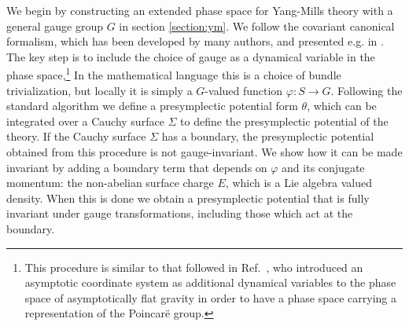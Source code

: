 \documentclass[a4paper,11pt]{article}
\begin{document}
We begin by constructing an extended phase space for Yang-Mills theory with a general gauge group $G$ in section \ref{section:ym}.
We follow the covariant canonical formalism, which has been developed by many authors, and presented e.g. in \cite{Crnkovic:1987tz}.
The key step is to include the choice of gauge as a dynamical variable in the phase space,\footnote{This procedure is similar to that followed in Ref.~\cite{Regge1974}, who introduced an asymptotic coordinate system as additional dynamical variables to the phase space of asymptotically flat gravity in order to have a phase space carrying a representation of the Poincar\"e group.}
In the mathematical language this is a choice of bundle trivialization, but locally it is simply a $G$-valued function $\varphi: S\to G$.
Following the standard algorithm we define a presymplectic potential form $\theta$, which can be integrated over a Cauchy surface $\Sigma$ to define the presymplectic potential of the theory.
If the Cauchy surface $\Sigma$ has a boundary, the presymplectic potential obtained from this procedure is not gauge-invariant.
We show how it can be made invariant by adding a boundary term that depends on $\varphi$ and its conjugate momentum: the non-abelian surface charge $E$, which is a Lie algebra valued density. 
When this is done we obtain a presymplectic potential that is fully invariant under gauge transformations, including those which act at the boundary.
\end{document}
